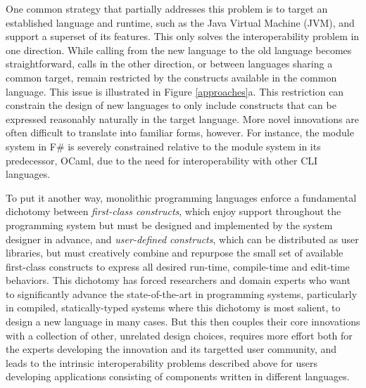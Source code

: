 One common strategy that partially addresses this problem is to target an established language and runtime, such as the Java Virtual Machine (JVM), and support a superset of its features. This only solves the interoperability problem in one direction. While calling from the new language to the old language becomes straightforward, calls in the other direction, or between languages sharing a common target, remain restricted by the constructs available in the common language. This issue is illustrated in Figure \ref{approaches}a. This restriction can  constrain the design of new languages to only include constructs that can be expressed reasonably naturally in the target language. More novel innovations are often difficult to translate into familiar forms, however. For instance, the module system in F\# is severely constrained relative to the module system in its predecessor, OCaml, due to the need for interoperability with other CLI languages.


To put it another way, monolithic programming languages enforce a fundamental dichotomy between \emph{first-class constructs}, which enjoy support throughout the programming system but must be designed and implemented by the system designer in advance, and \emph{user-defined constructs}, which can be distributed as user libraries, but must creatively combine and repurpose the small set of available first-class constructs to express all desired run-time, compile-time and edit-time behaviors. This dichotomy has forced researchers and domain experts who want to significantly advance the state-of-the-art in programming systems, particularly in compiled, statically-typed systems where this dichotomy is most salient, to design a new language in many cases. But this then couples their core innovations with a collection of other, unrelated design choices, requires more effort both for the experts developing the innovation and its targetted user community, and leads to the intrinsic interoperability problems described above for users developing applications consisting of components written in different languages.

